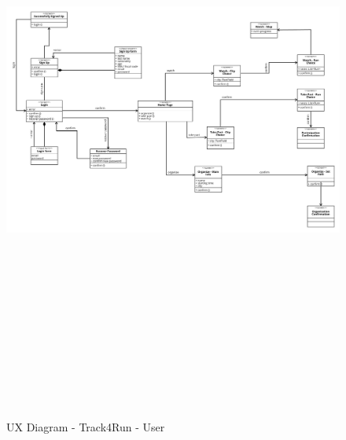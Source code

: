  \begin{figure}[H]
    \includegraphics[width=\linewidth, height = 20cm, keepaspectratio]{./Images/DD_UXD_T4R.png}
    \centering
    \caption{UX Diagram - Track4Run - User}
    \label{fig:sab}
 \end{figure}

